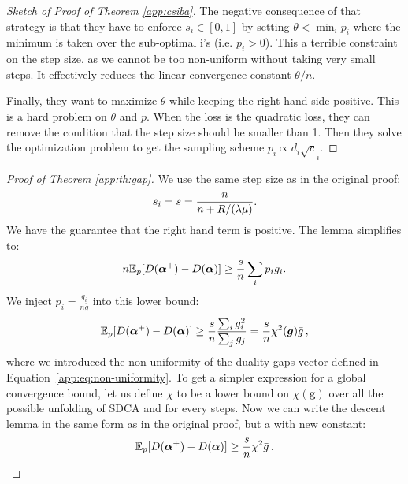 \begin{subappendices}
\begin{proof}[Sketch of Proof of Theorem \ref{app:csiba}]
		The negative consequence of that strategy is that they have to enforce $s_i \in [0,1]$ by setting
		$\theta < \min_i p_i$ where the minimum is taken over the sub-optimal i's (i.e. $p_i>0$).
		This a terrible constraint on the step size, as we cannot be too non-uniform without taking very small steps.
		It effectively reduces the linear convergence constant $\theta /n$.

		Finally, they want to maximize $\theta$ while keeping the right hand side positive.
		This is a hard problem on $\theta$ and $p$.
		When the loss is the quadratic loss, they can remove the condition that the step size should be smaller than 1.
		Then they solve the optimization problem to get the sampling scheme $p_i \propto d_i \sqrt c_i$.
	\end{proof}

	\begin{proof}[Proof of Theorem \ref{app:th:gap}]
		We use the same step size as in the original proof:
		\begin{equation}
			s_i = s = \frac{n}{n+R/(\lambda \mu)}.
		\end{equation}
		We have the guarantee that the right hand term is positive. The lemma simplifies to:
		\begin{equation}
			n \mathbb E_p[D(\boldsymbol{\alpha}^+) - D(\boldsymbol{\alpha})]
			\geq \frac{s}{n} \sum_i p_i g_i.
		\end{equation}
		We inject $p_i= \frac{g_i}{n\bar g}$ into this lower bound:
		\begin{equation}
			\mathbb E_p[D(\boldsymbol{\alpha}^+) - D(\boldsymbol{\alpha})]
			\geq \frac{s}{n} \frac{\sum_i g_i^2}{\sum_j g_j}
			= \frac{s}{n} \chi^2(\bm g) \bar g\, ,
		\end{equation}
		where we introduced the non-uniformity of the duality gaps vector defined in Equation~\eqref{app:eq:non-uniformity}.
		To get a simpler expression for a global convergence bound, let us define $\chi$ to be a lower bound on $\chi(\bm g)$ over all the possible unfolding of SDCA and for every steps.
		Now we can write the descent lemma in the same form as in the original proof, but a with new constant:
		\begin{equation}
			\mathbb E_p[D(\boldsymbol{\alpha}^+) - D(\boldsymbol{\alpha})]
			\geq \frac{s}{n} \chi^2 \bar g\, .
		\end{equation}
	\end{proof}


\end{subappendices}
